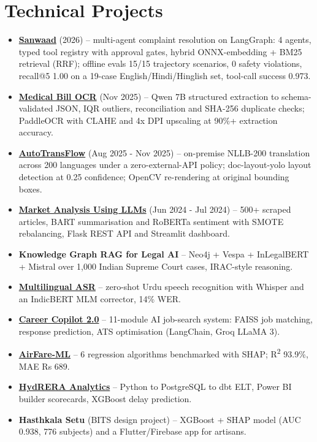 \documentclass[11pt,a4paper,sans]{moderncv}
\begin{document}
\section{Technical Projects}
\vspace{1pt}
\begin{itemize}
\item {\textbf{\href{https://github.com/Harshaaalll/sanwaad}{Sanwaad}} (2026) -- multi-agent complaint resolution on LangGraph: 4 agents, typed tool registry with approval gates, hybrid ONNX-embedding + BM25 retrieval (RRF); offline evals 15/15 trajectory scenarios, 0 safety violations, recall@5 1.00 on a 19-case English/Hindi/Hinglish set, tool-call success 0.973.}
\item {\textbf{\href{https://github.com/Harshaaalll/medical-bill-ocr-fraud}{Medical Bill OCR}} (Nov 2025) -- Qwen 7B structured extraction to schema-validated JSON, IQR outliers, reconciliation and SHA-256 duplicate checks; PaddleOCR with CLAHE and 4x DPI upscaling at 90\%+ extraction accuracy.}
\item {\textbf{\href{https://github.com/Harshaaalll/autotransflow}{AutoTransFlow}} (Aug 2025 - Nov 2025) -- on-premise NLLB-200 translation across 200 languages under a zero-external-API policy; doc-layout-yolo layout detection at 0.25 confidence; OpenCV re-rendering at original bounding boxes.}
\item {\textbf{\href{https://github.com/Harshaaalll/market-analysis-llm}{Market Analysis Using LLMs}} (Jun 2024 - Jul 2024) -- 500+ scraped articles, BART summarisation and RoBERTa sentiment with SMOTE rebalancing, Flask REST API and Streamlit dashboard.}
\item {\textbf{Knowledge Graph RAG for Legal AI} -- Neo4j + Vespa + InLegalBERT + Mistral over 1,000 Indian Supreme Court cases, IRAC-style reasoning.}
\item {\textbf{\href{https://github.com/Harshaaalll/multilingual-asr}{Multilingual ASR}} -- zero-shot Urdu speech recognition with Whisper and an IndicBERT MLM corrector, 14\% WER.}
\item {\textbf{\href{https://github.com/Harshaaalll/career-copilot}{Career Copilot 2.0}} -- 11-module AI job-search system: FAISS job matching, response prediction, ATS optimisation (LangChain, Groq LLaMA 3).}
\item {\textbf{\href{https://github.com/Harshaaalll/airfare-ml}{AirFare-ML}} -- 6 regression algorithms benchmarked with SHAP; R\textsuperscript{2} 93.9\%, MAE Rs 689.}
\item {\textbf{\href{https://github.com/Harshaaalll/hydera-analytics}{HydRERA Analytics}} -- Python to PostgreSQL to dbt ELT, Power BI builder scorecards, XGBoost delay prediction.}
\item {\textbf{Hasthkala Setu} (BITS design project) -- XGBoost + SHAP model (AUC 0.938, 776 subjects) and a Flutter/Firebase app for artisans.}
\end{itemize}
\end{document}
